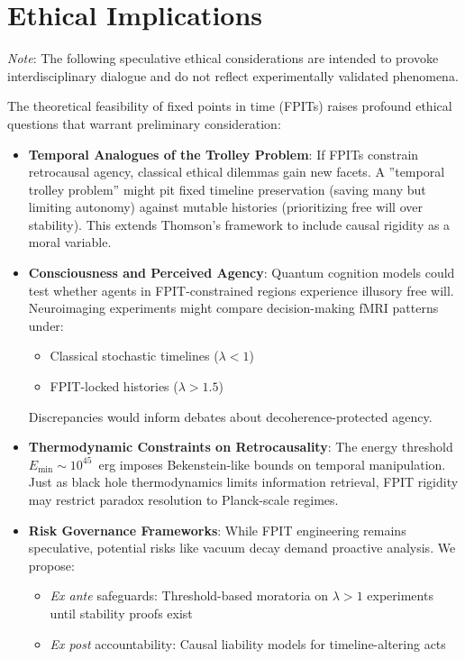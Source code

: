 \documentclass[twocolumn]{article}
\begin{document}
	\FloatBarrier%
	\section{Ethical Implications}\label{app:ethics}
	
	\textit{Note}: The following speculative ethical considerations are intended to provoke interdisciplinary dialogue and do not reflect experimentally validated phenomena.
	
	The theoretical feasibility of fixed points in time (FPITs) raises profound ethical questions that warrant preliminary consideration:
	
	\begin{itemize}
		\item \textbf{Temporal Analogues of the Trolley Problem}\cite{thomson1985}:  
		If FPITs constrain retrocausal agency, classical ethical dilemmas gain new facets. A ''temporal trolley problem'' might pit fixed timeline preservation (saving many but limiting autonomy) against mutable histories (prioritizing free will over stability). This extends Thomson's framework to include causal rigidity as a moral variable.
		
		\item \textbf{Consciousness and Perceived Agency}:  
		Quantum cognition models\cite{bruza2015} could test whether agents in FPIT-constrained regions experience illusory free will. Neuroimaging experiments might compare decision-making fMRI patterns under:  
		\begin{itemize}
			\item Classical stochastic timelines ($\lambda < 1$)  
			\item FPIT-locked histories ($\lambda > 1.5$)
		\end{itemize}
		Discrepancies would inform debates about decoherence-protected agency.
		
		\item \textbf{Thermodynamic Constraints on Retrocausality}:  
		The energy threshold $E_{\text{min}} \sim 10^{45}$~erg imposes Bekenstein-like bounds\cite{bekenstein1973} on temporal manipulation. Just as black hole thermodynamics limits information retrieval, FPIT rigidity may restrict paradox resolution to Planck-scale regimes\cite{Addazi2022}.
		
		\item \textbf{Risk Governance Frameworks}:  
		While FPIT engineering remains speculative, potential risks like vacuum decay\cite{Coleman1980} demand proactive analysis. We propose:  
		\begin{itemize}
			\item \textit{Ex ante} safeguards: Threshold-based moratoria on $\lambda > 1$ experiments until stability proofs exist  
			\item \textit{Ex post} accountability: Causal liability models for timeline-altering acts
		\end{itemize}
	\end{itemize}
	
\end{document}
